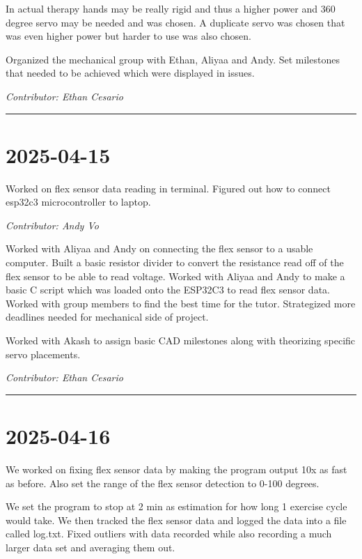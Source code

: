 \documentclass[12pt]{article}
\begin{document}
In actual therapy hands may be really rigid and thus a higher power and 360 degree servo may be needed and was chosen. A duplicate servo was chosen that was even higher power but harder to use was also chosen.

Organized the mechanical group with Ethan, Aliyaa and Andy. Set milestones that needed to be achieved which were displayed in issues. 

\vspace{1em}
\noindent\textit{Contributor: Ethan Cesario}
\vspace{1em}
\hrule


\section*{2025-04-15}
Worked on flex sensor data reading in terminal. Figured out how to connect esp32c3 microcontroller to laptop.


\vspace{1em}
\noindent\textit{Contributor: Andy Vo}
\vspace{1em}

Worked with Aliyaa and Andy on connecting the flex sensor to a usable computer. Built a basic resistor divider to convert the resistance read off of the flex sensor to be able to read voltage. Worked with Aliyaa and Andy to make a basic C script which was loaded onto the ESP32C3 to read flex sensor data. Worked with group members to find the best time for the tutor. Strategized more deadlines needed for mechanical side of project.

Worked with Akash to assign basic CAD milestones along with theorizing specific servo placements.

\vspace{1em}
\noindent\textit{Contributor: Ethan Cesario}
\vspace{1em}

\hrule

\section*{2025-04-16}
We worked on fixing flex sensor data by making the program output 10x as fast as before. Also set the range of the flex sensor detection to 0-100 degrees. 

We set the program to stop at 2 min as estimation for how long 1 exercise cycle would take. We then tracked the flex sensor data and logged the data into a file called log.txt. Fixed outliers with data recorded while also recording a much larger data set and averaging them out.
\end{document}
